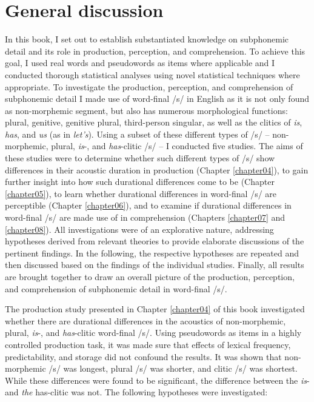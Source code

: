 \chapter{General discussion}\label{chapter09}

In this book, I set out to establish substantiated knowledge on subphonemic detail and its role in production, perception, and comprehension. To achieve this goal, I used real words and pseudowords as items where applicable and I conducted thorough statistical analyses using novel statistical techniques where appropriate. To investigate the production, perception, and comprehension of subphonemic detail I made use of word-final /s/ in English as it is not only found as non-morphemic segment, but also has numerous morphological functions: plural, genitive, genitive plural, third-person singular, as well as the clitics of \textit{is}, \textit{has}, and \textit{us} (as in \textit{let’s}). Using a subset of these different types of /s/ – non-morphemic, plural, \textit{is}-, and \textit{has}-clitic /s/ – I conducted five studies. The aims of these studies were to determine whether such different types of /s/ show differences in their acoustic duration in production (Chapter \ref{chapter04}), to gain further insight into how such durational differences come to be (Chapter \ref{chapter05}), to learn whether durational differences in word-final /s/ are perceptible (Chapter \ref{chapter06}), and to examine if durational differences in word-final /s/ are made use of in comprehension (Chapters \ref{chapter07} and \ref{chapter08}). All investigations were of an explorative nature, addressing hypotheses derived from relevant theories to provide elaborate discussions of the pertinent findings. In the following, the respective hypotheses are repeated and then discussed based on the findings of the individual studies. Finally, all results are brought together to draw an overall picture of the production, perception, and comprehension of subphonemic detail in word-final /s/.

The production study presented in Chapter \ref{chapter04} of this book investigated whether there are durational differences in the acoustics of non-morphemic, plural, \textit{is}-, and \textit{has}-clitic word-final /s/. Using pseudowords as items in a highly controlled production task, it was made sure that effects of lexical frequency, predictability, and storage did not confound the results. It was shown that non-morphemic /s/ was longest, plural /s/ was shorter, and clitic /s/ was shortest. While these differences were found to be significant, the difference between the \textit{is}- and \textit{the} has-clitic was not. The following hypotheses were investigated:

